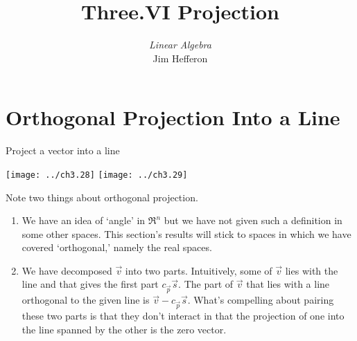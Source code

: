 \documentclass[10pt,t]{beamer}
\title[Projection] %
{Three.VI Projection}
\author{\textit{Linear Algebra} \\ {\small Jim Hef{}feron}}
\institute{
  \texttt{http://joshua.smcvt.edu/linearalgebra}
}
\date{}
\begin{document}
\begin{frame}
  \titlepage
\end{frame}




\section{Orthogonal Projection Into a Line}
\begin{frame}{Project a vector into a line}
\begin{center}
  \texttt{[image: ../ch3.28]}
  \hspace*{0.6in}
  \texttt{[image: ../ch3.29]}      
\end{center}
\pause
{}

\pause
{}
\end{frame}




\begin{frame}
Note two things about orthogonal projection.
\begin{enumerate}
\item 
We have an idea of `angle' in $\Re^n$ but we have not given such a 
definition in some other spaces.
This section's results will stick to spaces in which we have 
covered `orthogonal,' namely the real spaces.

\pause
\item 
We have decomposed $\vec{v}$ into two parts.
Intuitively, some of $\vec{v}$ lies with the line and that gives
the first part $c_{\vec{p}}\vec{s}$.
The part of $\vec{v}$ that lies with a line orthogonal to 
the given line is $\vec{v}-c_{\vec{p}}\vec{s}$.
What's compelling about pairing these two parts 
is that they don't interact in that the projection of one into the line
spanned by the other is the zero vector.
\end{enumerate}
\end{frame}
\end{document}
